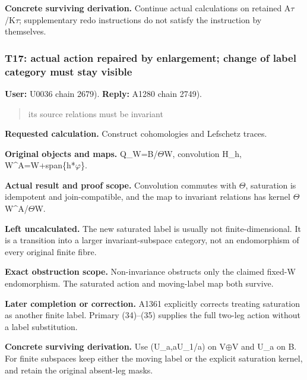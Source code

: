 \documentclass[10pt,a4paper,oneside]{report}
\begin{document}
\textbf{Concrete surviving derivation.} Continue actual calculations on
retained
A\allowbreak{}\ensuremath{τ}\allowbreak{}/K\allowbreak{}\ensuremath{τ}\allowbreak{};
supplementary redo instructions do not satisfy the instruction by
themselves.

\subsubsection{T17: actual action repaired by enlargement; change of
label category must stay
visible}\label{t17-actual-action-repaired-by-enlargement-change-of-label-category-must-stay-visible}

\textbf{User:} U0036
\protect{} chain 2679).
\textbf{Reply:} A1280
\protect{} chain 2749).

\begin{quote}
its source relations must be invariant
\end{quote}

\textbf{Requested calculation.} Construct cohomologies and Lefschetz
traces.

\textbf{Original objects and maps.}
Q\_W=B/\allowbreak{}\ensuremath{Θ}\allowbreak{}W, convolution H\_h,
W\textasciicircum{}A=W+span\{h*\allowbreak{}\ensuremath{φ}\allowbreak{}\}.

\textbf{Actual result and proof scope.} Convolution commutes with
\allowbreak{}\ensuremath{Θ}\allowbreak{}, saturation is idempotent and
join-compatible, and the map to invariant relations has kernel
\allowbreak{}\ensuremath{Θ}\allowbreak{}W\textasciicircum{}A/\allowbreak{}\ensuremath{Θ}\allowbreak{}W.

\textbf{Left uncalculated.} The new saturated label is usually not
finite-dimensional. It is a transition into a larger invariant-subspace
category, not an endomorphism of every original finite fibre.

\textbf{Exact obstruction scope.} Non-invariance obstructs only the
claimed fixed-W endomorphism. The saturated action and moving-label map
both survive.

\textbf{Later completion or correction.} A1361 explicitly corrects
treating saturation as another finite label. Primary (34)--(35) supplies
the full two-leg action without a label substitution.

\textbf{Concrete surviving derivation.} Use (U\_a,aU\_1/a) on
V\allowbreak{}\ensuremath{⊕}\allowbreak{}V and U\_a on B. For finite
subspaces keep either the moving label or the explicit saturation
kernel, and retain the original absent-leg masks.
\end{document}
